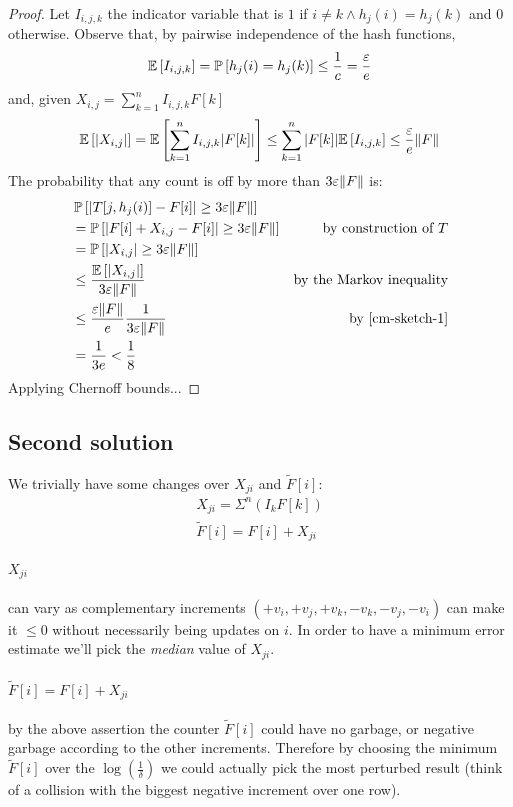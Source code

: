 \begin{proof}
  Let $I_{i,j,k}$ the indicator variable that is $1$ if $i \ne k \wedge h_j(i)=h_j(k)$ and $0$ otherwise. Observe that, by pairwise independence of the hash functions,
  $$\mathbb{E}\left[{I_{i,j,k}}\right] = \operatorname*{\mathbb{P}}\left[{h_j(i)=h_j(k)}\right] \leq \frac{1}{c} = \frac{\varepsilon}{e} $$
  and, given $X_{i,j}=\sum_{k=1}^n I_{i,j,k}F[k]$
  \begin{equation}
    \label{cm-sketch-1}
  	\mathbb{E}\left[{|X_{i,j}|}\right] = \mathbb{E}\left[{\sum_{k=1}^n I_{i,j,k}|F[k]|}\right] \leq \sum_{k=1}^n |F[k]|\mathbb{E}\left[{I_{i,j,k}}\right] \leq \frac{\varepsilon}{e}\lVert F\rVert
  \end{equation}
  The probability that any count is off by more than $3\varepsilon\lVert F\rVert$ is:
  \begin{align*}
    &  \operatorname*{\mathbb{P}}\left[{|T[j, h_j(i)]-F[i]| \geq 3\varepsilon\lVert F\rVert}\right] &  \\
    &= \operatorname*{\mathbb{P}}\left[{|F[i]+X_{i,j}-F[i]| \geq 3\varepsilon\lVert F\rVert}\right] & \text{by construction of $T$} \\
    &= \operatorname*{\mathbb{P}}\left[{|X_{i,j}| \geq 3\varepsilon\lVert F\rVert}\right] & \\
    &\leq \frac{\mathbb{E}\left[{|X_{i,j}|}\right]}{3\varepsilon\lVert F\rVert} & \text{by the Markov inequality} \\
    &\leq \frac{\varepsilon\lVert F\rVert}{e} \frac{1}{3\varepsilon\lVert F\rVert} & \text{by \eqref{cm-sketch-1}} \\
    &= \frac{1}{3e} < \frac{1}{8} &
  \end{align*}
  Applying Chernoff bounds...
\end{proof}

\subsection{Second solution}

We trivially have some changes over $X_{ji}$ and $\tilde{F}[i]$:
    \begin{gather*}
        X_{ji} = \Sigma^{n}(I_k F[k]) \\
        \tilde{F}[i] = F[i] + X_{ji}
    \end{gather*}
\label{X_ji}\paragraph{$X_{ji}$} can vary as complementary increments $(+v_i, +v_j, +v_k, -v_k, -v_j, -v_i)$
can make it $\leq 0$ without necessarily being updates on $i$.
In order to have a minimum error estimate we'll pick the \emph{median} value of $X_{ji}$.
\label{f_tilde}~\paragraph{$\tilde{F}[i] = F[i] + X_{ji}$} by the above assertion the counter $\tilde{F}[i]$ could have no garbage, or negative
garbage according to the other increments.
Therefore by choosing the minimum $\tilde{F}[i]$ over the $\log(\frac{1}{\delta})$ we
could actually pick the most perturbed result (think of a collision with the
biggest negative increment over one row).

